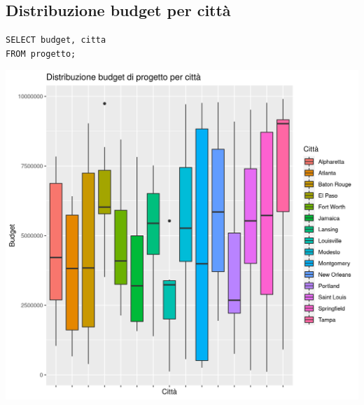\documentclass{article}
\begin{document}
\subsection{Distribuzione budget per città}
\begin{verbatim}
SELECT budget, citta 
FROM progetto;
\end{verbatim}
\begin{center}
\includegraphics[width=\textwidth]{plot_dist_budget_progetto_citta.png}
\end{center}

\newpage
\end{document}

